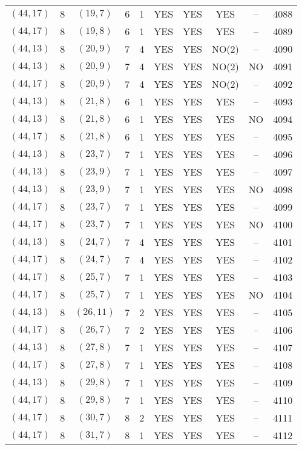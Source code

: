 \begin{longtable}{|c|c|c|c|c|c|c|c|c|c|}
$(44, 17)$ & 8 & $(19, 7)$ & 6 & 1 & YES & YES & YES & -- & 4088\\
$(44, 17)$ & 8 & $(19, 8)$ & 6 & 1 & YES & YES & YES & -- & 4089\\
$(44, 13)$ & 8 & $(20, 9)$ & 7 & 4 & YES & YES & NO(2) & -- & 4090\\
$(44, 13)$ & 8 & $(20, 9)$ & 7 & 4 & YES & YES & NO(2) & NO & 4091\\
$(44, 17)$ & 8 & $(20, 9)$ & 7 & 4 & YES & YES & NO(2) & -- & 4092\\
$(44, 13)$ & 8 & $(21, 8)$ & 6 & 1 & YES & YES & YES & -- & 4093\\
$(44, 13)$ & 8 & $(21, 8)$ & 6 & 1 & YES & YES & YES & NO & 4094\\
$(44, 17)$ & 8 & $(21, 8)$ & 6 & 1 & YES & YES & YES & -- & 4095\\
$(44, 13)$ & 8 & $(23, 7)$ & 7 & 1 & YES & YES & YES & -- & 4096\\
$(44, 13)$ & 8 & $(23, 9)$ & 7 & 1 & YES & YES & YES & -- & 4097\\
$(44, 13)$ & 8 & $(23, 9)$ & 7 & 1 & YES & YES & YES & NO & 4098\\
$(44, 17)$ & 8 & $(23, 7)$ & 7 & 1 & YES & YES & YES & -- & 4099\\
$(44, 17)$ & 8 & $(23, 7)$ & 7 & 1 & YES & YES & YES & NO & 4100\\
$(44, 13)$ & 8 & $(24, 7)$ & 7 & 4 & YES & YES & YES & -- & 4101\\
$(44, 17)$ & 8 & $(24, 7)$ & 7 & 4 & YES & YES & YES & -- & 4102\\
$(44, 17)$ & 8 & $(25, 7)$ & 7 & 1 & YES & YES & YES & -- & 4103\\
$(44, 17)$ & 8 & $(25, 7)$ & 7 & 1 & YES & YES & YES & NO & 4104\\
$(44, 13)$ & 8 & $(26, 11)$ & 7 & 2 & YES & YES & YES & -- & 4105\\
$(44, 17)$ & 8 & $(26, 7)$ & 7 & 2 & YES & YES & YES & -- & 4106\\
$(44, 13)$ & 8 & $(27, 8)$ & 7 & 1 & YES & YES & YES & -- & 4107\\
$(44, 17)$ & 8 & $(27, 8)$ & 7 & 1 & YES & YES & YES & -- & 4108\\
$(44, 13)$ & 8 & $(29, 8)$ & 7 & 1 & YES & YES & YES & -- & 4109\\
$(44, 17)$ & 8 & $(29, 8)$ & 7 & 1 & YES & YES & YES & -- & 4110\\
$(44, 17)$ & 8 & $(30, 7)$ & 8 & 2 & YES & YES & YES & -- & 4111\\
$(44, 17)$ & 8 & $(31, 7)$ & 8 & 1 & YES & YES & YES & -- & 4112\\

\end{longtable}
